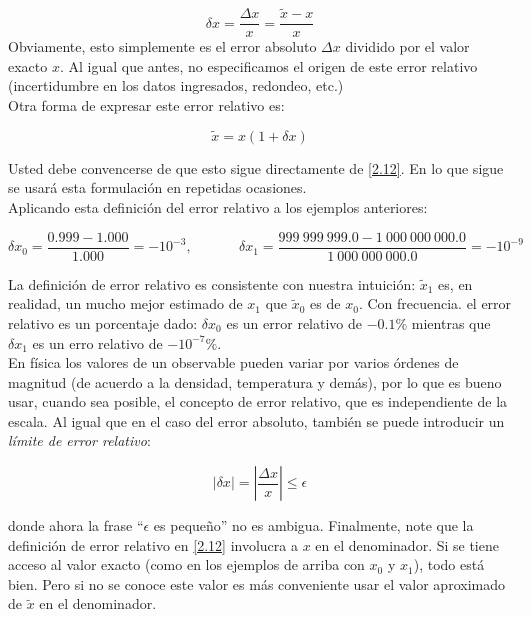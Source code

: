 \documentclass[11pt]{article}
\begin{document}
\[
\begin{equation}
\delta x = \frac{\Delta x}{x} = \frac{\tilde{x} - x}{x} \label{2.12} \tag{9}
\end{equation}
\] Obviamente, esto simplemente es el error absoluto \(\Delta x\)
dividido por el valor exacto \(x\). Al igual que antes, no especificamos
el origen de este error relativo (incertidumbre en los datos ingresados,
redondeo, etc.)\\
Otra forma de expresar este error relativo es:

\[
\begin{equation}
\tilde{x} = x(1 + \delta x) \label{2.13}\tag{10}
\end{equation}
\]

Usted debe convencerse de que esto sigue directamente de \eqref{2.12}.
En lo que sigue se usará esta formulación en repetidas ocasiones.\\
Aplicando esta definición del error relativo a los ejemplos anteriores:

\[
\delta x_0 = \frac{0.999 - 1.000}{1.000} = -10^{-3}, \ \ \ \ \ \ \ \ \ \ \ \ \ \ \
\delta x_1 = \frac{999 \ 999 \ 999.0 - 1 \ 000 \ 000 \ 000.0}{1 \ 000 \ 000 \ 000.0} = -10^{-9} \label{2.14}\tag{11}
\]

La definición de error relativo es consistente con nuestra intuición:
\(\tilde{x}_1\) es, en realidad, un mucho mejor estimado de \(x_1\) que
\(\tilde{x}_0\) es de \(x_0\). Con frecuencia. el error relativo es un
porcentaje dado: \(\delta x_0\) es un error relativo de \(-0.1\%\)
mientras que \(\delta x_1\) es un erro relativo de \(-10^{-7}\%\).\\
En física los valores de un observable pueden variar por varios órdenes
de magnitud (de acuerdo a la densidad, temperatura y demás), por lo que
es bueno usar, cuando sea posible, el concepto de error relativo, que es
independiente de la escala. Al igual que en el caso del error absoluto,
también se puede introducir un \emph{límite de error relativo}:

\[
\begin{equation}
|\delta x| = \left| \frac{\Delta x}{x} \right| \leq \epsilon \label{2.15}\tag{12}
\end{equation}
\]

donde ahora la frase ``\(\epsilon\) es pequeño'' no es ambigua.
Finalmente, note que la definición de error relativo en \eqref{2.12}
involucra a \(x\) en el denominador. Si se tiene acceso al valor exacto
(como en los ejemplos de arriba con \(x_0\) y \(x_1\)), todo está bien.
Pero si no se conoce este valor es más conveniente usar el valor
aproximado de \(\tilde{x}\) en el denominador.
\end{document}
